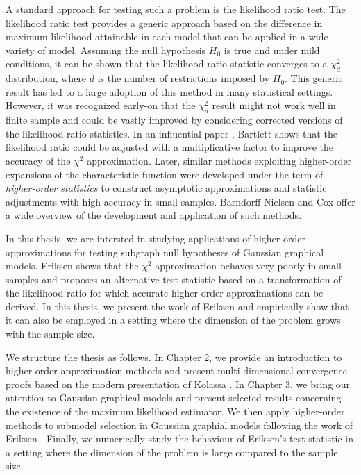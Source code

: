 A standard approach for testing such a problem is the likelihood ratio test. The likelihood ratio test provides a generic approach based on the difference in maximum likelihood attainable in each model that can be applied in a wide variety of model. Assuming the null hypothesis $H_0$ is true and under mild conditions, it can be shown that the likelihood ratio statistic converges to a $\chi^2_d$ distribution, where $d$ is the number of restrictions imposed by $H_0$. This generic result has led to a large adoption of this method in many statistical settings. However, it was recognized early-on that the $\chi^2_d$ result might not work well in finite sample and could be vastly improved by considering corrected versions of the likelihood ratio statistics. In an influential paper \cite{bartlett1937properties}, Bartlett shows that the likelihood ratio could be adjusted with a multiplicative factor to improve the accuracy of the $\chi^2$ approximation. Later, similar methods exploiting higher-order expansions of the characteristic function were developed under the term of \textit{higher-order statistics} to construct asymptotic approximations and statistic adjustments with high-accuracy in small samples. Barndorff-Nielsen and Cox \cite{barndorff1989asymptotic, cox1994inference} offer a wide overview of the development and application of such methods.

In this thesis, we are intersted in studying applications of higher-order approximations for testing subgraph null hypotheses of Gaussian graphical models. Eriksen \cite{eriksen1996tests} shows that the $\chi^2$ approximation behaves very poorly in small samples and proposes an alternative test statistic based on a transformation of the likelihood ratio for which accurate higher-order approximations can be derived. In this thesis, we present the work of Eriksen and empirically show that it can also be employed in a setting where the dimension of the problem grows with the sample size.

We structure the thesis as follows. In Chapter 2, we provide an introduction to higher-order approximation methods and present multi-dimensional convergence proofs based on the modern presentation of Kolassa \cite{kolassa2006series}. In Chapter 3, we bring our attention to Gaussian graphical models and present selected results concerning the existence of the maximum likelihood estimator. We then apply higher-order methods to submodel selection in Gaussian graphial models following the work of Eriksen \cite{eriksen1996tests}. Finally, we numerically study the behaviour of Eriksen's test statistic in a setting where the dimension of the problem is large compared to the sample size.